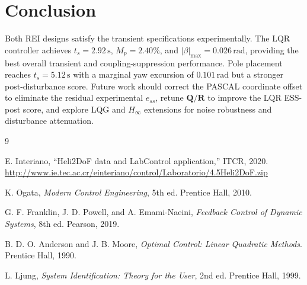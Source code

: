 \documentclass[conference]{IEEEtran}
\begin{document}
\section{Conclusion}
\label{sec:conclusion}

Both REI designs satisfy the transient specifications experimentally. The LQR controller achieves $t_s = 2.92\,\text{s}$, $M_p = 2.40\%$, and $|\beta|_{\max} = 0.026\,\text{rad}$, providing the best overall transient and coupling-suppression performance. Pole placement reaches $t_s = 5.12\,\text{s}$ with a marginal yaw excursion of $0.101\,\text{rad}$ but a stronger post-disturbance score. Future work should correct the PASCAL coordinate offset to eliminate the residual experimental $e_{ss}$, retune $\mathbf{Q}/\mathbf{R}$ to improve the LQR ESS-post score, and explore LQG and $H_\infty$ extensions for noise robustness and disturbance attenuation.

\begin{thebibliography}{9}

E. Interiano,
``Heli2DoF data and LabControl application,'' ITCR, 2020.
\url{http://www.ie.tec.ac.cr/einteriano/control/Laboratorio/4.5Heli2DoF.zip}

K. Ogata,
\textit{Modern Control Engineering}, 5th ed.
Prentice Hall, 2010.

G. F. Franklin, J. D. Powell, and A. Emami-Naeini,
\textit{Feedback Control of Dynamic Systems}, 8th ed.
Pearson, 2019.

B. D. O. Anderson and J. B. Moore,
\textit{Optimal Control: Linear Quadratic Methods}.
Prentice Hall, 1990.

L. Ljung,
\textit{System Identification: Theory for the User}, 2nd ed.
Prentice Hall, 1999.

\end{thebibliography}
\end{document}

